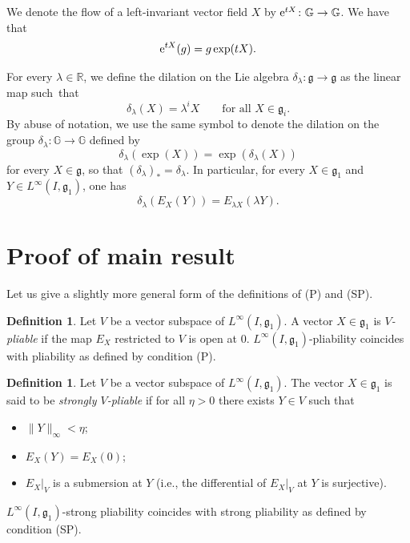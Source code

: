 \documentclass[pdftex]{sigma}
\numberwithin{equation}{section}
\theoremstyle{definition}
\newtheorem{Definition}[Theorem]{Definition}
\begin{document}
We denote the flow of a left-invariant vector field $X$ by ${\rm e}^{tX}\colon \mathbb{G}\to\mathbb{G}$. We have that
\[
{\rm e}^{tX}(g)=g\exp(tX).
\]

For every $\lambda\in\mathbb{R}$, we define the dilation on the Lie algebra $\delta_\lambda\colon {\mathfrak g}\to{\mathfrak g}$ as the linear map such~that
\[
 \delta_\lambda(X)=\lambda^i X \qquad \text{for all } X\in{\mathfrak g}_i.
\]
By abuse of notation, we use the same symbol to denote the dilation on the group $\delta_\lambda\colon \mathbb{G} \to \mathbb{G}$ defined by
\begin{equation}\label{eq:dilations-flow}
\delta_\lambda (\exp(X)) = \exp (\delta_\lambda(X))
\end{equation}
for every $X \in {\mathfrak g}$, so that $(\delta_\lambda)_* = \delta_\lambda$. In particular,
for
every $X \in {\mathfrak g}_1$ and $Y \in L^\infty(I,{\mathfrak g}_1)$, one has
\begin{equation}
\label{eq:dilations-flow2}
\delta_\lambda (E_X(Y)) = E_{\lambda X} (\lambda Y).
\end{equation}

\section{Proof of main result}\label{sec:proof}

Let us give a slightly more general form of the definitions of (P) and (SP).

\begin{Definition}\label{def:pl}
Let $V$ be a vector subspace of $L^\infty(I,{\mathfrak g}_1)$. A vector $X\in {\mathfrak g}_1$ is \emph{$V$-pliable} if the map $E_X$ restricted to $V$ is open at $0$.
$L^\infty(I,{\mathfrak g}_1)$-pliability coincides with pliability as defined by condition (P).
\end{Definition}

\begin{Definition}\label{def:strongpl}
 Let $V$ be a vector subspace of $L^\infty(I,{\mathfrak g}_1)$. The vector $X\in{\mathfrak g}_1$ is said to be \emph{strongly $V$-pliable} if for all $\eta>0$ there exists $Y\in V$ such that
 \begin{itemize}\itemsep=0pt
 	\item[(i)] $\|Y\|_\infty<\eta$;
 	\item[(ii)] $E_X(Y)=E_X(0)$;
 	\item[(iii)] $E_X|_V$ is a submersion at $Y$ (i.e., the differential of $E_X|_V$ at $Y$ is surjective).
 \end{itemize}
 $L^\infty(I,{\mathfrak g}_1)$-strong pliability coincides with strong pliability as defined by condition (SP).
\end{Definition}
\end{document}
